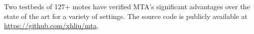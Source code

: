 {%
Two testbeds of 127+ motes have verified MTA's significant advantages over the state of the art for a variety of settings.
The source code is publicly available at \url{https://github.com/xhliu/mta}.
}

